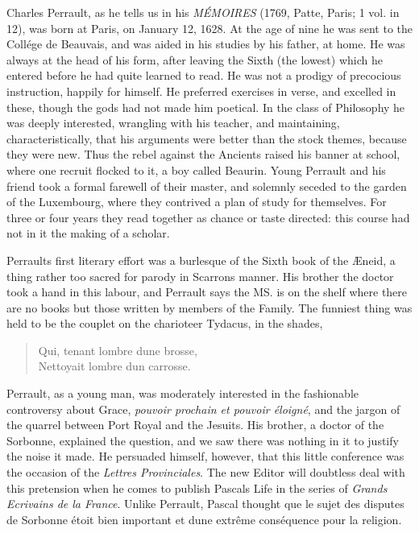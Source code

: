 \documentclass[14pt,a4paper]{memoir}
\begin{document}
Charles Perrault, as he tells us in his \emph{MÉMOIRES} (1769, Patte,
Paris; 1 vol. in 12), was born at Paris, on January 12, 1628. At the age
of nine he was sent to the Collége de Beauvais, and was aided in his
studies by his father, at home. He was always at the head of his form,
after leaving the Sixth (the lowest) which he entered before he had
quite learned to read. He was not a prodigy of precocious instruction,
happily for himself. He preferred exercises in verse, and excelled in
these, though the gods had not made him poetical. In the class of
Philosophy he was deeply interested, wrangling with his teacher, and
maintaining, characteristically, that his arguments were better than the
stock themes, \textquotesingle because they were new.\textquotesingle{}
Thus the rebel against the Ancients raised his banner at school, where
one recruit flocked to it, a boy called Beaurin. Young Perrault and his
friend took a formal farewell of their master, and solemnly seceded to
the garden of the Luxembourg, where they contrived a plan of study for
themselves. For three or four years they read together as chance or
taste directed: this course had not in it the making of a scholar.

Perrault\textquotesingle s first literary effort was a burlesque of the
Sixth book of the Æneid, a thing rather too sacred for parody in
Scarron\textquotesingle s manner. His brother the doctor took a hand in
this labour, and Perrault says \textquotesingle the MS. is on the shelf
where there are no books but those written by members of the
Family.\textquotesingle{} The funniest thing was held to be the couplet
on the charioteer Tydacus, in the shades,

\begin{verse}
\small
Qui, tenant l\textquotesingle ombre d\textquotesingle une brosse, \\
Nettoyait l\textquotesingle ombre d\textquotesingle un carrosse.
\end{verse}

Perrault, as a young man, was moderately interested in the fashionable
controversy about Grace, \emph{pouvoir prochain et pouvoir éloigné}, and
the jargon of the quarrel between Port Royal and the Jesuits. His
brother, a doctor of the Sorbonne, explained the question,
\textquotesingle and we saw there was nothing in it to justify the noise
it made.\textquotesingle{} He persuaded himself, however, that this
little conference was the occasion of the \emph{Lettres Provinciales}.
The new Editor will doubtless deal with this pretension when he comes to
publish Pascal\textquotesingle s Life in the series of \emph{Grands
Ecrivains de la France}. Unlike Perrault, Pascal thought
\textquotesingle que le sujet des disputes de Sorbonne étoit bien
important et d\textquotesingle une extrême conséquence pour la
religion.\textquotesingle{}
\end{document}
